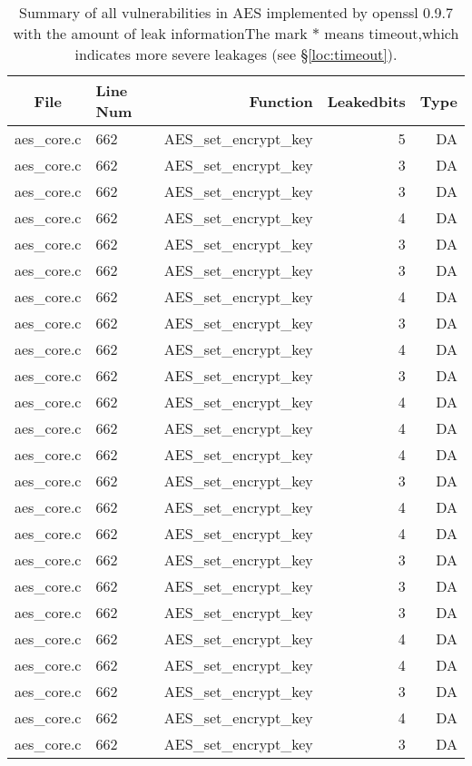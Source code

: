 \begin{table*}%
\centering
\caption{Summary of all vulnerabilities in AES implemented by openssl 0.9.7 with the amount of leak informationThe mark $*$ means timeout,which indicates more severe leakages (see \S\ref{loc:timeout}).}\label{tab:AESopenssl}
\begin{tabular}{clrrr}
\hline
\textbf{File} & \textbf{Line Num} & \textbf{Function} & \textbf{Leakedbits} & \textbf{Type} \\\hline
aes\_core.c&662&AES\_set\_encrypt\_key&5 &DA\\
aes\_core.c&662&AES\_set\_encrypt\_key&3 &DA\\
aes\_core.c&662&AES\_set\_encrypt\_key&3 &DA\\
aes\_core.c&662&AES\_set\_encrypt\_key&4 &DA\\
aes\_core.c&662&AES\_set\_encrypt\_key&3 &DA\\
aes\_core.c&662&AES\_set\_encrypt\_key&3 &DA\\
aes\_core.c&662&AES\_set\_encrypt\_key&4 &DA\\
aes\_core.c&662&AES\_set\_encrypt\_key&3 &DA\\
aes\_core.c&662&AES\_set\_encrypt\_key&4 &DA\\
aes\_core.c&662&AES\_set\_encrypt\_key&3 &DA\\
aes\_core.c&662&AES\_set\_encrypt\_key&4 &DA\\
aes\_core.c&662&AES\_set\_encrypt\_key&4 &DA\\
aes\_core.c&662&AES\_set\_encrypt\_key&4 &DA\\
aes\_core.c&662&AES\_set\_encrypt\_key&3 &DA\\
aes\_core.c&662&AES\_set\_encrypt\_key&4 &DA\\
aes\_core.c&662&AES\_set\_encrypt\_key&4 &DA\\
aes\_core.c&662&AES\_set\_encrypt\_key&3 &DA\\
aes\_core.c&662&AES\_set\_encrypt\_key&3 &DA\\
aes\_core.c&662&AES\_set\_encrypt\_key&3 &DA\\
aes\_core.c&662&AES\_set\_encrypt\_key&4 &DA\\
aes\_core.c&662&AES\_set\_encrypt\_key&4 &DA\\
aes\_core.c&662&AES\_set\_encrypt\_key&3 &DA\\
aes\_core.c&662&AES\_set\_encrypt\_key&4 &DA\\
aes\_core.c&662&AES\_set\_encrypt\_key&3 &DA\\

\end{tabular}
\end{table*}
